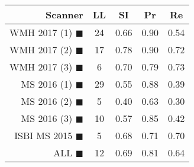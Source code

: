 \begin{tabular}{rcccc}
\toprule
Scanner & LL & SI & Pr & Re \\
\midrule
WMH 2017 (1) {\color[rgb]{ 1.00 0.00 0.00}$\blacksquare$} & 24 & 0.66 & 0.90 & 0.54 \\
WMH 2017 (2) {\color[rgb]{ 1.00 0.50 0.00}$\blacksquare$} & 17 & 0.78 & 0.90 & 0.72 \\
WMH 2017 (3) {\color[rgb]{ 1.00 0.80 0.00}$\blacksquare$} & 6 & 0.70 & 0.79 & 0.73 \\
MS  2016 (1) {\color[rgb]{ 0.20 0.80 0.00}$\blacksquare$} & 29 & 0.55 & 0.88 & 0.39 \\
MS  2016 (2) {\color[rgb]{ 0.00 0.40 1.00}$\blacksquare$} & 5 & 0.40 & 0.63 & 0.30 \\
MS  2016 (3) {\color[rgb]{ 0.60 0.00 1.00}$\blacksquare$} & 10 & 0.57 & 0.85 & 0.42 \\
ISBI MS 2015 {\color[rgb]{ 1.00 0.00 1.00}$\blacksquare$} & 5 & 0.68 & 0.71 & 0.70 \\
\midrule
ALL {\color[rgb]{ 1.00 1.00 1.00}$\blacksquare$} & 12 & 0.69 & 0.81 & 0.64 \\
\bottomrule
\end{tabular}